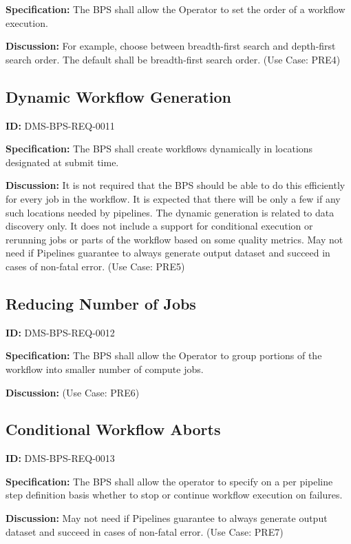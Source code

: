 \documentclass[SE,toc,lsstdraft]{lsstdoc}
\begin{document}
\textbf{Specification:}
The BPS shall allow the Operator to set the order of a workflow execution.

\textbf{Discussion:}
For example, choose between breadth-first search and depth-first search order. The default shall be breadth-first search order.  (Use Case: PRE4)

\subsection{Dynamic Workflow Generation}

\label{DMS-BPS-REQ-0011}
\textbf{ID:} DMS-BPS-REQ-0011

\textbf{Specification:}
The BPS shall create workflows dynamically in locations designated at submit time.

\textbf{Discussion:}
It is not required that the BPS should be able to do this efficiently for every job in the workflow. It is expected that there will be only a few if any such locations needed by pipelines. The dynamic generation is related to data discovery only. It does not include a support for conditional execution or rerunning jobs or parts of the workflow based on some quality metrics.  May not need if Pipelines guarantee to always generate output dataset and succeed in cases of non-fatal error.  (Use Case: PRE5)

\subsection{Reducing Number of Jobs}

\label{DMS-BPS-REQ-0012}
\textbf{ID:} DMS-BPS-REQ-0012

\textbf{Specification:}
The BPS shall allow the Operator to group portions of the workflow into smaller number of compute jobs.

\textbf{Discussion:}
(Use Case: PRE6)

\subsection{Conditional Workflow Aborts}

\label{DMS-BPS-REQ-0013}
\textbf{ID:} DMS-BPS-REQ-0013

\textbf{Specification:}
The BPS shall allow the operator to specify on a per pipeline step definition basis whether to stop or continue workflow execution on failures.

\textbf{Discussion:}
May not need if Pipelines guarantee to always generate output dataset and succeed in cases of non-fatal error.  (Use Case: PRE7)
\end{document}
